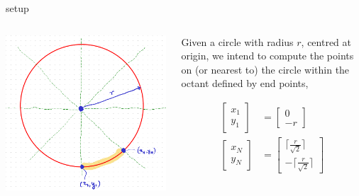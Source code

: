 \documentclass[aspectratio=169,xcolor={dvipsnames,svgnames}]{beamer}
\begin{document}
\begin{frame}[label={sec:org6c4c76d}]{setup}
\begin{columns}
\begin{column}{.4\columnwidth}
\begin{center}
\includegraphics[width=.9\linewidth]{org-download-images/mid-point_algorithm/2024-09-03_21-50-20_screenshot.png}
\end{center}
\end{column}

\begin{column}{.6\columnwidth}
Given a circle with radius \(r\), centred at origin, we
intend to compute the points on (or nearest to) the
circle within the octant defined by end points,

\begin{align*}
  \begin{bmatrix} x_1 \\ y_1 \end{bmatrix}
  &= \begin{bmatrix} 0 \\ -r \end{bmatrix} \\
  \begin{bmatrix} x_N \\ y_N \end{bmatrix}
  &= \begin{bmatrix} \lceil\frac{r}{\sqrt{2}}\rceil \\
    -\lceil\frac{r}{\sqrt{2}}\rceil \end{bmatrix}
\end{align*}
\end{column}
\end{columns}
\end{frame}
\end{document}
